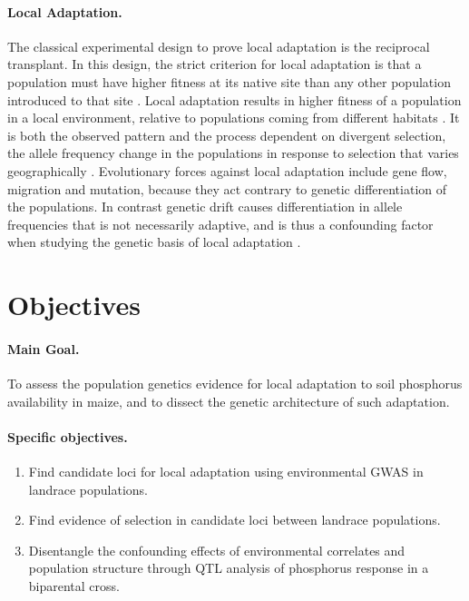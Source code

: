 \documentclass[10pt,letterpaper]{article}
\begin{document}
\paragraph{Local Adaptation.} 
The classical experimental design to prove local adaptation is the reciprocal transplant. In this design, the strict criterion for local adaptation is that a population must have higher fitness at its native site than any other population introduced to that site \cite{Savolainen:2013df}. Local adaptation results in higher fitness  of a population in a local environment, relative to populations coming from different habitats \cite{Kawecki:2004hx}. It is both the observed pattern and the process dependent on divergent selection, the allele frequency change in the populations in response to selection that varies geographically \cite{Tiffin:2014ft}. Evolutionary forces against local adaptation include gene flow, migration and  mutation, because  they act contrary to genetic differentiation of the populations. In contrast genetic drift causes differentiation in allele frequencies that is not necessarily adaptive, and is thus a confounding factor when studying the genetic basis of local adaptation \cite{Kawecki:2004hx}.

\section*{Objectives}

\paragraph{Main Goal.} 

To assess the population genetics evidence for local adaptation to soil phosphorus availability in maize, and to dissect the genetic architecture of such adaptation.


\paragraph{Specific objectives.}

\begin{enumerate}  
\item Find candidate loci for local adaptation using environmental GWAS in landrace populations.

\item Find evidence of selection in candidate loci between landrace populations.

\item Disentangle the confounding effects of environmental correlates and population structure through QTL analysis of phosphorus response in a biparental cross.
 
\end{enumerate}
\end{document}

